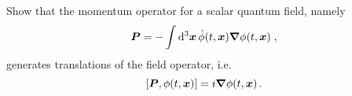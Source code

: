 \begin{ex} \label{ex_11} 
    Show that the momentum operator for a scalar quantum field, namely
    \begin{equation}
        \boldsymbol{P} = - \int {\rm d}^3 \boldsymbol{x} \, \dot{\phi}(t, \boldsymbol{x}) \boldsymbol{\nabla} \phi(t, \boldsymbol{x}) \; ,
        \label{Eq_Ex11_vP_def}
    \end{equation}
    generates translations of the field operator, i.e.\
    \begin{equation}
        \left[ \boldsymbol{P}, \phi(t, \boldsymbol{x}) \right] = i \boldsymbol{\nabla} \phi(t, \boldsymbol{x}) \,.
    \end{equation}
\end{ex}



